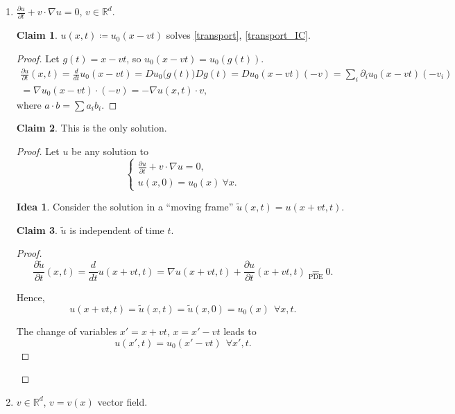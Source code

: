 \documentclass[12pt]{article}
\theoremstyle{definition}
\newtheorem*{claim*}{Claim}
\newtheorem*{idea}{Idea}
\begin{document}
\begin{enumerate}[label=\alph*)]
\item $\frac{\partial u}{\partial t}+v\cdot\nabla u=0$, $v\in\mathbb R^d$.

\begin{claim*}
$u(x,t)\coloneqq u_0(x-vt)$ solves \ref{transport}, \eqref{transport_IC}.
\end{claim*}

\begin{proof}
Let $g(t)=x-vt$, so $u_0(x-vt)=u_0(g(t))$.
\begin{multline*}
\frac{\partial u}{\partial t}(x,t)=\frac d{dt}u_0(x-vt)=Du_0\big(g(t)\big)Dg(t)=Du_0(x-vt)(-v)=\sum_i\partial_iu_0(x-vt)(-v_i)\\
=\nabla u_0(x-vt)\cdot(-v)=-\nabla u(x,t)\cdot v,
\end{multline*}
where $a\cdot b=\sum a_ib_i$.
\end{proof}

\begin{claim*}
This is the only solution.
\end{claim*}

\begin{proof}
Let $u$ be any solution to
\[\left\{\begin{array}{l}\frac{\partial u}{\partial t}+v\cdot\nabla u=0,\\u(x,0)=u_0(x)\ \forall x.\end{array}\right.\]

\begin{idea}
Consider the solution in a ``moving frame'' $\tilde u(x,t)=u(x+vt,t)$.
\end{idea}

\begin{claim*}
$\tilde u$ is independent of time $t$.
\end{claim*}

\begin{proof}
\[\frac{\partial\tilde u}{\partial t}(x,t)=\frac d{dt}u(x+vt,t)=\nabla u(x+vt,t)+\frac{\partial u}{\partial t}(x+vt,t)\underset{\text{PDE}}=0.\]

Hence,
\[u(x+vt,t)=\tilde u(x,t)=\tilde u(x,0)=u_0(x)\ \ \forall x,t.\]

The change of variables $x'=x+vt$, $x=x'-vt$ leads to
\[u(x',t)=u_0(x'-vt)\ \ \forall x',t.\]
\end{proof}
\end{proof}

\item $v\in\mathbb R^d$, $v=v(x)$ vector field.


\end{enumerate}
\end{document}
